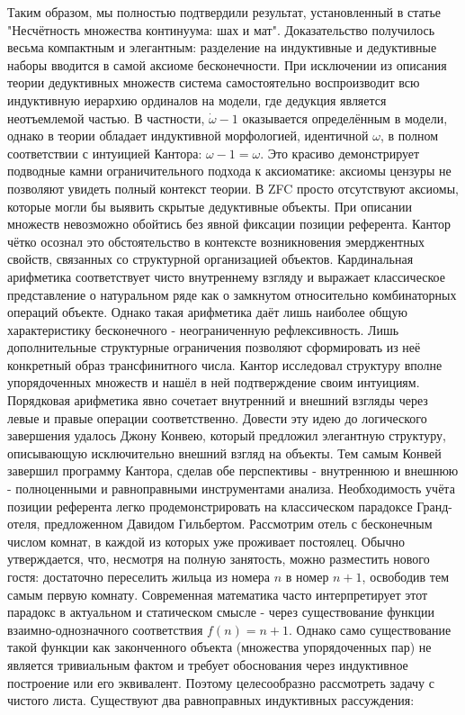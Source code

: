 \documentclass[12pt]{article}
\begin{document}
Таким образом, мы полностью подтвердили результат, установленный в статье "Несчётность множества континуума: шах и мат". Доказательство получилось весьма компактным и элегантным: разделение на индуктивные и дедуктивные наборы вводится в самой аксиоме бесконечности. При исключении из описания теории дедуктивных множеств система самостоятельно воспроизводит всю индуктивную иерархию ординалов на модели, где дедукция является неотъемлемой частью. В частности, $\dot{\omega} - 1$ оказывается определённым в модели, однако в теории обладает индуктивной морфологией, идентичной $\omega$, в полном соответствии с интуицией Кантора: $\omega - 1 = \omega$. Это красиво демонстрирует подводные камни ограничительного подхода к аксиоматике: аксиомы цензуры не позволяют увидеть полный контекст теории. В ZFC просто отсутствуют аксиомы, которые могли бы выявить скрытые дедуктивные объекты. При описании множеств невозможно обойтись без явной фиксации позиции референта. Кантор чётко осознал это обстоятельство в контексте возникновения эмерджентных свойств, связанных со структурной организацией объектов. Кардинальная арифметика соответствует чисто внутреннему взгляду и выражает классическое представление о натуральном ряде как о замкнутом относительно комбинаторных операций объекте. Однако такая арифметика даёт лишь наиболее общую характеристику бесконечного - неограниченную рефлексивность. Лишь дополнительные структурные ограничения позволяют сформировать из неё конкретный образ трансфинитного числа. Кантор исследовал структуру вполне упорядоченных множеств и нашёл в ней подтверждение своим интуициям. Порядковая арифметика явно сочетает внутренний и внешний взгляды через левые и правые операции соответственно. Довести эту идею до логического завершения удалось Джону Конвею, который предложил элегантную структуру, описывающую исключительно внешний взгляд на объекты. Тем самым Конвей завершил программу Кантора, сделав обе перспективы - внутреннюю и внешнюю - полноценными и равноправными инструментами анализа. Необходимость учёта позиции референта легко продемонстрировать на классическом парадоксе Гранд-отеля, предложенном Давидом Гильбертом. Рассмотрим отель с бесконечным числом комнат, в каждой из которых уже проживает постоялец. Обычно утверждается, что, несмотря на полную занятость, можно разместить нового гостя: достаточно переселить жильца из номера $n$ в номер $n + 1$, освободив тем самым первую комнату. Современная математика часто интерпретирует этот парадокс в актуальном и статическом смысле - через существование функции взаимно-однозначного соответствия $f(n) = n + 1$. Однако само существование такой функции как законченного объекта (множества упорядоченных пар) не является тривиальным фактом и требует обоснования через индуктивное построение или его эквивалент. Поэтому целесообразно рассмотреть задачу с чистого листа. Существуют два равноправных индуктивных рассуждения:
\end{document}

